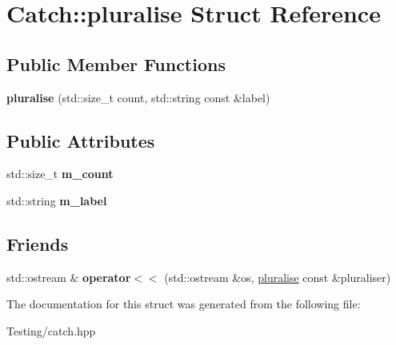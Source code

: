 \hypertarget{struct_catch_1_1pluralise}{\section{Catch\-:\-:pluralise Struct Reference}
\label{struct_catch_1_1pluralise}
}
\subsection*{Public Member Functions}
\begin{DoxyCompactItemize}
\item 
\hypertarget{struct_catch_1_1pluralise_a5c55e22de2416cfe416edf715c6b9234}{{\bfseries pluralise} (std\-::size\-\_\-t count, std\-::string const \&label)}\label{struct_catch_1_1pluralise_a5c55e22de2416cfe416edf715c6b9234}

\end{DoxyCompactItemize}
\subsection*{Public Attributes}
\begin{DoxyCompactItemize}
\item 
\hypertarget{struct_catch_1_1pluralise_a4dce2fa13ec6f00fac09b2418265441e}{std\-::size\-\_\-t {\bfseries m\-\_\-count}}\label{struct_catch_1_1pluralise_a4dce2fa13ec6f00fac09b2418265441e}

\item 
\hypertarget{struct_catch_1_1pluralise_a8849cbdd3f11ebe7747597c8644e8793}{std\-::string {\bfseries m\-\_\-label}}\label{struct_catch_1_1pluralise_a8849cbdd3f11ebe7747597c8644e8793}

\end{DoxyCompactItemize}
\subsection*{Friends}
\begin{DoxyCompactItemize}
\item 
\hypertarget{struct_catch_1_1pluralise_aa7dac6b165514c1f85e0695d678fdef5}{std\-::ostream \& {\bfseries operator$<$$<$} (std\-::ostream \&os, \hyperlink{struct_catch_1_1pluralise}{pluralise} const \&pluraliser)}\label{struct_catch_1_1pluralise_aa7dac6b165514c1f85e0695d678fdef5}

\end{DoxyCompactItemize}


The documentation for this struct was generated from the following file\-:\begin{DoxyCompactItemize}
\item 
Testing/catch.\-hpp\end{DoxyCompactItemize}
